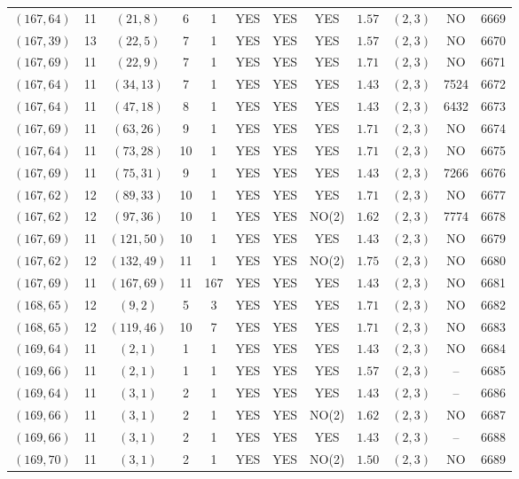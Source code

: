 \begin{longtable}{|c|c|c|c|c|c|c|c|c|c|c|c|}
$(167,64)$ & 11 & $(21,8)$ & 6 & 1 & YES & YES & YES & $1.57$ & $(2,3)$ & NO & 6669\\
$(167,39)$ & 13 & $(22,5)$ & 7 & 1 & YES & YES & YES & $1.57$ & $(2,3)$ & NO & 6670\\
$(167,69)$ & 11 & $(22,9)$ & 7 & 1 & YES & YES & YES & $1.71$ & $(2,3)$ & NO & 6671\\
$(167,64)$ & 11 & $(34,13)$ & 7 & 1 & YES & YES & YES & $1.43$ & $(2,3)$ & 7524 & 6672\\
$(167,64)$ & 11 & $(47,18)$ & 8 & 1 & YES & YES & YES & $1.43$ & $(2,3)$ & 6432 & 6673\\
$(167,69)$ & 11 & $(63,26)$ & 9 & 1 & YES & YES & YES & $1.71$ & $(2,3)$ & NO & 6674\\
$(167,64)$ & 11 & $(73,28)$ & 10 & 1 & YES & YES & YES & $1.71$ & $(2,3)$ & NO & 6675\\
$(167,69)$ & 11 & $(75,31)$ & 9 & 1 & YES & YES & YES & $1.43$ & $(2,3)$ & 7266 & 6676\\
$(167,62)$ & 12 & $(89,33)$ & 10 & 1 & YES & YES & YES & $1.71$ & $(2,3)$ & NO & 6677\\
$(167,62)$ & 12 & $(97,36)$ & 10 & 1 & YES & YES & NO(2) & $1.62$ & $(2,3)$ & 7774 & 6678\\
$(167,69)$ & 11 & $(121,50)$ & 10 & 1 & YES & YES & YES & $1.43$ & $(2,3)$ & NO & 6679\\
$(167,62)$ & 12 & $(132,49)$ & 11 & 1 & YES & YES & NO(2) & $1.75$ & $(2,3)$ & NO & 6680\\
$(167,69)$ & 11 & $(167,69)$ & 11 & 167 & YES & YES & YES & $1.43$ & $(2,3)$ & NO & 6681\\
$(168,65)$ & 12 & $(9,2)$ & 5 & 3 & YES & YES & YES & $1.71$ & $(2,3)$ & NO & 6682\\
$(168,65)$ & 12 & $(119,46)$ & 10 & 7 & YES & YES & YES & $1.71$ & $(2,3)$ & NO & 6683\\
$(169,64)$ & 11 & $(2,1)$ & 1 & 1 & YES & YES & YES & $1.43$ & $(2,3)$ & NO & 6684\\
$(169,66)$ & 11 & $(2,1)$ & 1 & 1 & YES & YES & YES & $1.57$ & $(2,3)$ & -- & 6685\\
$(169,64)$ & 11 & $(3,1)$ & 2 & 1 & YES & YES & YES & $1.43$ & $(2,3)$ & -- & 6686\\
$(169,66)$ & 11 & $(3,1)$ & 2 & 1 & YES & YES & NO(2) & $1.62$ & $(2,3)$ & NO & 6687\\
$(169,66)$ & 11 & $(3,1)$ & 2 & 1 & YES & YES & YES & $1.43$ & $(2,3)$ & -- & 6688\\
$(169,70)$ & 11 & $(3,1)$ & 2 & 1 & YES & YES & NO(2) & $1.50$ & $(2,3)$ & NO & 6689\\

\end{longtable}
